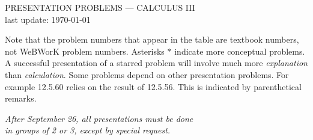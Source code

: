 \documentclass[12pt]{amsart}
\begin{document}
\begin{center}
    PRESENTATION PROBLEMS --- CALCULUS III \\ last update: \today
\end{center}

Note that the problem numbers that appear in the table are textbook numbers, 
not WeBWorK problem numbers. Asterisks $\ast$ indicate more conceptual 
problems. A successful presentation of a starred problem will involve much
more \emph{explanation} than \emph{calculation}. Some problems depend 
on other presentation problems. For example 12.5.60 relies on the result of 
12.5.56. This is indicated by parenthetical remarks.

\begin{center}
    {\large \emph{After September 26, all presentations must be done\\ in groups of 2 or 3, except by special request.}}
\end{center}
\end{document}
